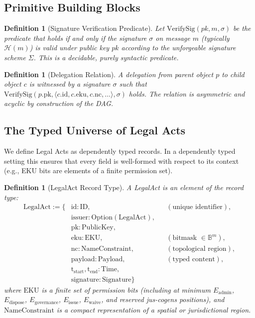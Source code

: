 \documentclass[11pt,a4paper]{article}
\newtheorem{definition}[theorem]{Definition}
\begin{document}
\subsection{Primitive Building Blocks}

\begin{definition}[Signature Verification Predicate]
Let \(\text{VerifySig}(pk, m, \sigma)\) be the predicate that holds if and only if the signature \(\sigma\) on message \(m\) (typically \(\mathcal{H}(m)\)) is valid under public key \(pk\) according to the unforgeable signature scheme \(\Sigma\). This is a decidable, purely syntactic predicate.
\end{definition}

\begin{definition}[Delegation Relation]
A delegation from parent object \(p\) to child object \(c\) is witnessed by a signature \(\sigma\) such that \(\text{VerifySig}(p.\text{pk}, \langle c.\text{id}, c.\text{eku}, c.\text{nc}, \dots \rangle, \sigma)\) holds. The relation is asymmetric and acyclic by construction of the DAG.
\end{definition}

\subsection{The Typed Universe of Legal Acts}

We define Legal Acts as dependently typed records. In a dependently typed setting this ensures that every field is well-formed with respect to its context (e.g., EKU bits are elements of a finite permission set).

\begin{definition}[LegalAct Record Type]
A \emph{LegalAct} is an element of the record type:
\begin{align*}
\text{LegalAct} := \{ & \text{id} : \text{ID}, && (\text{unique identifier}), \\
  & \text{issuer} : \text{Option}(\text{LegalAct}), \\
  & \text{pk} : \text{PublicKey}, \\
  & \text{eku} : \text{EKU}, && (\text{bitmask } \in \mathbb{B}^m), \\
  & \text{nc} : \text{NameConstraint}, && (\text{topological region}), \\
  & \text{payload} : \text{Payload}, && (\text{typed content}), \\
  & \text{t}_{\text{start}}, \text{t}_{\text{end}} : \text{Time}, \\
  & \text{signature} : \text{Signature} \}
\end{align*}
where \(\text{EKU}\) is a finite set of permission bits (including at minimum \(E_{\text{admin}}\), \(E_{\text{dispose}}\), \(E_{\text{governance}}\), \(E_{\text{issue}}\), \(E_{\text{waive}}\), and reserved jus-cogens positions), and \(\text{NameConstraint}\) is a compact representation of a spatial or jurisdictional region.
\end{definition}
\end{document}
